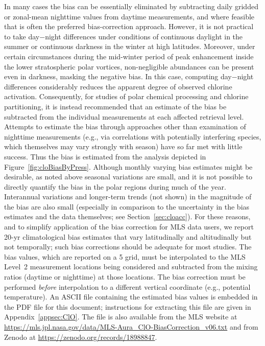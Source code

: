 In many cases the  bias can be essentially eliminated by subtracting daily gridded or zonal-mean nighttime values from daytime measurements, and where feasible that is often the preferred bias-correction approach. However, it is not practical to take day$-$night differences under conditions of continuous daylight in the summer or continuous darkness in the winter at high latitudes. Moreover, under certain circumstances during the mid-winter period of peak  enhancement inside the lower stratospheric polar vortices, non-negligible  abundances can be present even in darkness, masking the negative bias. In this case, computing day$-$night differences considerably reduces the apparent degree of observed chlorine activation. Consequently, for studies of polar chemical processing and chlorine partitioning, it is instead recommended that an estimate of the bias be subtracted from the individual measurements at each affected retrieval level. Attempts to estimate the bias through approaches other than examination of nighttime  measurements (e.g., via correlations with potentially interfering species, which themselves may vary strongly with season) have so far met with little success. Thus the bias is estimated from the analysis depicted in Figure~\ref{fig:cloBiasByPress}. Although monthly varying bias estimates might be desirable, as noted above seasonal variations are small, and it is not possible to directly quantify the bias in the polar regions during much of the year. Interannual variations and longer-term trends (not shown) in the magnitude of the bias are also small (especially in comparison to the uncertainty in the bias estimates and the \thisv {} data themselves; see Section~\ref{sec:cloacc}). For these reasons, and to simplify application of the  bias correction for MLS data users, we report \mbox{20-yr} climatological bias estimates that vary latitudinally and altitudinally but not temporally; such bias corrections should be adequate for most studies. The bias values, which are reported on a 5{\degsym} grid, must be interpolated to the MLS Level~2 measurement locations being considered and subtracted from the  mixing ratios (daytime or nighttime) at those locations. The bias correction must be performed \emph{before} interpolation to a different vertical coordinate (e.g., potential temperature). An ASCII file containing the estimated  bias values is embedded in the PDF file for this document; instructions for extracting this file are given in Appendix~\ref{appsec:ClO}. The file is also available from the MLS website at \url{https://mls.jpl.nasa.gov/data/MLS-Aura_ClO-BiasCorrection_v06.txt} and from Zenodo at \url{https://zenodo.org/records/18988847}.

